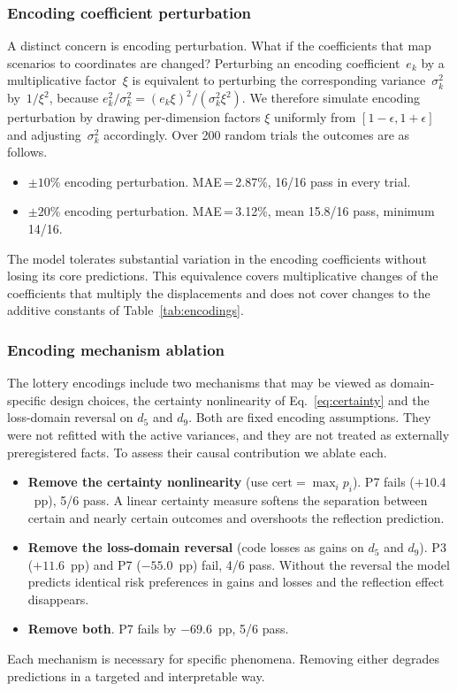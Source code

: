 \documentclass[journal]{IEEEtran}
\begin{document}
\subsubsection{Encoding coefficient perturbation}
A distinct concern is encoding perturbation.
What if the coefficients that map scenarios to coordinates are changed?
Perturbing an encoding coefficient~$e_k$ by a multiplicative factor~$\xi$ is equivalent to perturbing the corresponding variance~$\sigma_k^2$ by~$1/\xi^2$, because $e_k^2/\sigma_k^2 = (e_k \xi)^2 / (\sigma_k^2 \xi^2)$.
We therefore simulate encoding perturbation by drawing per-dimension factors $\xi$ uniformly from $[1-\epsilon, 1+\epsilon]$ and adjusting~$\sigma_k^2$ accordingly.
Over 200 random trials the outcomes are as follows.
\begin{itemize}
    \item $\pm10\%$ encoding perturbation. MAE\,=\,2.87\%, 16/16 pass in every trial.
    \item $\pm20\%$ encoding perturbation. MAE\,=\,3.12\%, mean 15.8/16 pass, minimum 14/16.
\end{itemize}
The model tolerates substantial variation in the encoding coefficients without losing its core predictions.
This equivalence covers multiplicative changes of the coefficients that multiply the displacements and does not cover changes to the additive constants of Table~\ref{tab:encodings}.

\subsubsection{Encoding mechanism ablation}
The lottery encodings include two mechanisms that may be viewed as domain-specific design choices, the certainty nonlinearity of Eq.~\eqref{eq:certainty} and the loss-domain reversal on $d_5$ and $d_9$.
Both are fixed encoding assumptions.
They were not refitted with the active variances, and they are not treated as externally preregistered facts.
To assess their causal contribution we ablate each.
\begin{itemize}
    \item \textbf{Remove the certainty nonlinearity} (use $\mathrm{cert} = \max_i p_i$). P7 fails ($+10.4$~pp), 5/6 pass. A linear certainty measure softens the separation between certain and nearly certain outcomes and overshoots the reflection prediction.
    \item \textbf{Remove the loss-domain reversal} (code losses as gains on $d_5$ and $d_9$). P3 ($+11.6$~pp) and P7 ($-55.0$~pp) fail, 4/6 pass. Without the reversal the model predicts identical risk preferences in gains and losses and the reflection effect disappears.
    \item \textbf{Remove both}. P7 fails by $-69.6$~pp, 5/6 pass.
\end{itemize}
Each mechanism is necessary for specific phenomena.
Removing either degrades predictions in a targeted and interpretable way.
\end{document}
